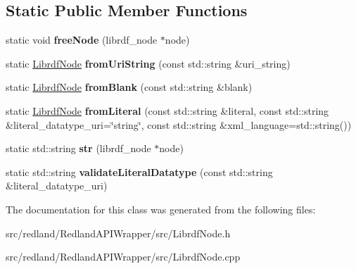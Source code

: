 \subsection*{Static Public Member Functions}
\begin{DoxyCompactItemize}
\item 
\mbox{\label{classredland_1_1LibrdfNode_a5c971e6daeca94c4eabddfa5f6e4c456}} 
static void {\bfseries free\+Node} (librdf\+\_\+node $\ast$node)
\item 
\mbox{\label{classredland_1_1LibrdfNode_aacf853ee60f9d706bc7e95fb426166bd}} 
static \hyperlink{classredland_1_1LibrdfNode}{Librdf\+Node} {\bfseries from\+Uri\+String} (const std\+::string \&uri\+\_\+string)
\item 
\mbox{\label{classredland_1_1LibrdfNode_a22ea96262be432e6abb5c1e28ede3071}} 
static \hyperlink{classredland_1_1LibrdfNode}{Librdf\+Node} {\bfseries from\+Blank} (const std\+::string \&blank)
\item 
\mbox{\label{classredland_1_1LibrdfNode_a346fad618a010ef983ce24d62891de0e}} 
static \hyperlink{classredland_1_1LibrdfNode}{Librdf\+Node} {\bfseries from\+Literal} (const std\+::string \&literal, const std\+::string \&literal\+\_\+datatype\+\_\+uri=\char`\"{}string\char`\"{}, const std\+::string \&xml\+\_\+language=std\+::string())
\item 
\mbox{\label{classredland_1_1LibrdfNode_aa6bf7e25e68e473f2f39cb7b4cb5f39b}} 
static std\+::string {\bfseries str} (librdf\+\_\+node $\ast$node)
\item 
\mbox{\label{classredland_1_1LibrdfNode_a3242e29edb736ba0aa8ac42fd6b3ae58}} 
static std\+::string {\bfseries validate\+Literal\+Datatype} (const std\+::string \&literal\+\_\+datatype\+\_\+uri)
\end{DoxyCompactItemize}


The documentation for this class was generated from the following files\+:\begin{DoxyCompactItemize}
\item 
src/redland/\+Redland\+A\+P\+I\+Wrapper/src/Librdf\+Node.\+h\item 
src/redland/\+Redland\+A\+P\+I\+Wrapper/src/Librdf\+Node.\+cpp\end{DoxyCompactItemize}
